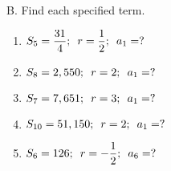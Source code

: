 B. Find each specified term.  

\begin{enumerate}[label = \arabic*. ]
%

\item \hspce $S_5 = \displaystyle \frac{31}{4}; \hspace{0.5em} r=\frac{1}{2}; \hspace{0.5em} a_1=? $
\item \hspce $\displaystyle S_8 = 2,550; \hspace{0.5em} r=2;\hspace{0.5em} a_1=? $
\item \hspce $\displaystyle S_7 = 7,651;\hspace{0.5em}  r=3;\hspace{0.5em} a_1=? $
\item \hspce $\displaystyle S_{10} = 51,150; \hspace{0.5em} r=2;\hspace{0.5em} a_1=? $
\item \hspce $S_6 = 126;\hspace{0.5em} \displaystyle r=-\frac{1}{2};\hspace{0.5em} a_6=? $

%
\end{enumerate}